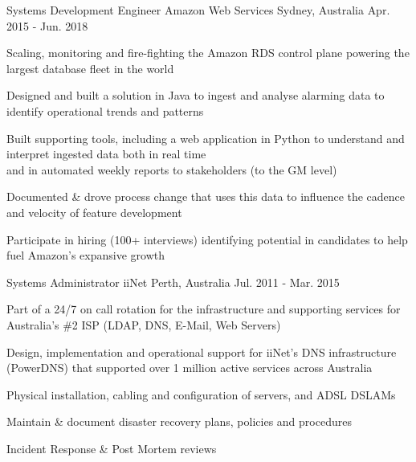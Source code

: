 \begin{cventries}
  \cventry
    {Systems Development Engineer} %
    {Amazon Web Services} %
    {Sydney, Australia} %
    {Apr. 2015 - Jun. 2018} %
    {
      \begin{cvitems} %
        \item {Scaling, monitoring and fire-fighting the Amazon RDS control plane powering the largest database fleet in the world}
        \item {Designed and built a solution in Java to ingest and analyse alarming data to identify operational trends and patterns }
        \item {Built supporting tools, including a web application in Python to understand and interpret ingested data both in real time\\
        and in automated weekly reports to stakeholders (to the GM level)}
        \item {Documented \& drove process change that uses this data to influence the cadence and velocity of feature development }
        \item {Participate in hiring (100+ interviews) identifying potential in candidates to help fuel Amazon's expansive growth}
      \end{cvitems}
    }

  \cventry
    {Systems Administrator} %
    {iiNet} %
    {Perth, Australia} %
    {Jul. 2011 - Mar. 2015} %
    {
      \begin{cvitems} %
        \item {Part of a 24/7 on call rotation for the infrastructure and supporting services for Australia's \#2 ISP (LDAP, DNS, E-Mail, Web Servers)}
        \item {Design, implementation and operational support for iiNet's DNS infrastructure (PowerDNS) that supported over 1 million active services across Australia}
        \item {Physical installation, cabling and configuration of servers, and ADSL DSLAMs}
        \item {Maintain \& document disaster recovery plans, policies and procedures}
        \item {Incident Response \& Post Mortem reviews}
      \end{cvitems}
    }
\end{cventries}
